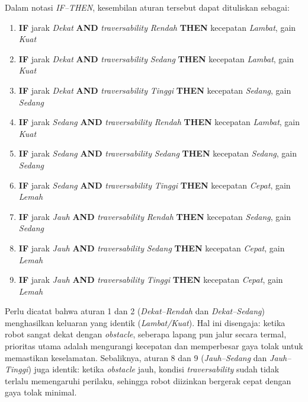 Dalam notasi \textit{IF--THEN}, kesembilan aturan tersebut dapat dituliskan sebagai:

\begin{enumerate}
    \item \textbf{IF} jarak \textit{Dekat} \textbf{AND} \textit{traversability} \textit{Rendah}
    \textbf{THEN} kecepatan \textit{Lambat}, gain \textit{Kuat}
    \item \textbf{IF} jarak \textit{Dekat} \textbf{AND} \textit{traversability} \textit{Sedang}
    \textbf{THEN} kecepatan \textit{Lambat}, gain \textit{Kuat}
    \item \textbf{IF} jarak \textit{Dekat} \textbf{AND} \textit{traversability} \textit{Tinggi}
    \textbf{THEN} kecepatan \textit{Sedang}, gain \textit{Sedang}
    \item \textbf{IF} jarak \textit{Sedang} \textbf{AND} \textit{traversability} \textit{Rendah}
    \textbf{THEN} kecepatan \textit{Lambat}, gain \textit{Kuat}
    \item \textbf{IF} jarak \textit{Sedang} \textbf{AND} \textit{traversability} \textit{Sedang}
    \textbf{THEN} kecepatan \textit{Sedang}, gain \textit{Sedang}
    \item \textbf{IF} jarak \textit{Sedang} \textbf{AND} \textit{traversability} \textit{Tinggi}
    \textbf{THEN} kecepatan \textit{Cepat}, gain \textit{Lemah}
    \item \textbf{IF} jarak \textit{Jauh} \textbf{AND} \textit{traversability} \textit{Rendah}
    \textbf{THEN} kecepatan \textit{Sedang}, gain \textit{Sedang}
    \item \textbf{IF} jarak \textit{Jauh} \textbf{AND} \textit{traversability} \textit{Sedang}
    \textbf{THEN} kecepatan \textit{Cepat}, gain \textit{Lemah}
    \item \textbf{IF} jarak \textit{Jauh} \textbf{AND} \textit{traversability} \textit{Tinggi}
    \textbf{THEN} kecepatan \textit{Cepat}, gain \textit{Lemah}
\end{enumerate}

Perlu dicatat bahwa aturan 1 dan 2 (\textit{Dekat--Rendah} dan \textit{Dekat--Sedang}) menghasilkan keluaran yang identik (\textit{Lambat/Kuat}). Hal ini disengaja: ketika robot sangat dekat dengan \textit{obstacle}, seberapa lapang pun jalur secara termal, prioritas utama adalah mengurangi kecepatan dan memperbesar gaya tolak untuk memastikan keselamatan. Sebaliknya, aturan 8 dan 9 (\textit{Jauh--Sedang} dan \textit{Jauh--Tinggi}) juga identik: ketika \textit{obstacle} jauh, kondisi \textit{traversability} sudah tidak terlalu memengaruhi perilaku, sehingga robot diizinkan bergerak cepat dengan gaya tolak minimal.

